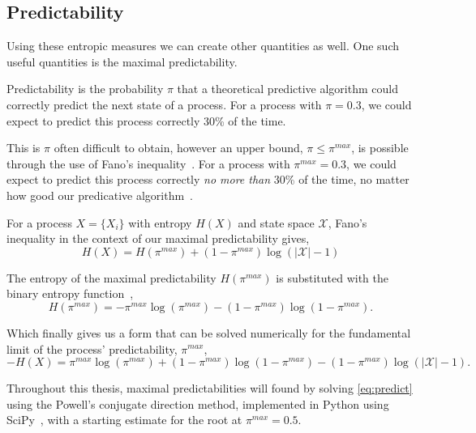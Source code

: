 \subsection{Predictability}

Using these entropic measures we can create other quantities as well. One such useful quantities is the maximal predictability.

Predictability is the probability $\pi$ that a theoretical predictive algorithm could correctly predict the next state of a process. For a process with $\pi = 0.3$, we could expect to predict this process correctly 30\% of the time. 

This is $\pi$ often difficult to obtain, however an upper bound, $\pi \leq \pi^{max}$, is possible through the use of Fano's inequality~\cite{fano_transmission_1961}.  For a process with $\pi^{max} = 0.3$, we could expect to predict this process correctly \emph{no more than} 30\% of the time, no matter how good our predicative algorithm~\cite{song_limits_2010}.


\begin{definition}\label{def:maximialpredictability}
For a process $X = \{ X_i \}$ with entropy $H(X)$ and state space $\mathcal{X}$, Fano's inequality in the context of our maximal predictability gives,
\begin{equation}
H(X) = H(\pi^{max}) + (1 - \pi^{max}) \log (|\mathcal{X}| - 1)
\end{equation}
\end{definition}

The entropy of the maximal predictability $H(\pi^{max})$ is substituted with the binary entropy function~\cite{song_limits_2010},   
\begin{equation}
H(\pi^{max}) = -\pi^{max} \log(\pi^{max}) - (1 -  \pi^{max}) \log(1 - \pi^{max}).
\end{equation}

Which finally gives us a form that can be solved numerically for the fundamental limit of the process' predictability, $\pi^{max}$,
\begin{equation}\label{eq:predict}
-H(X)  = \pi^{max} \log(\pi^{max}) + (1 -  \pi^{max}) \log(1 - \pi^{max}) - (1 - \pi^{max}) \log (|\mathcal{X}| - 1).
\end{equation}


Throughout this thesis, maximal predictabilities will found by solving \autoref{eq:predict} using the Powell's conjugate direction method, implemented in Python using SciPy~\cite{virtanen_scipy_2019}, with a starting estimate for the root at $\pi^{max}=0.5$.

